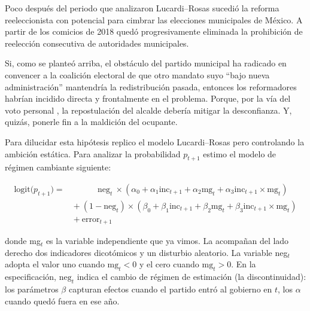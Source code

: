 \documentclass[letter,12pt]{article}
\begin{document}
Poco después del periodo que analizaron Lucardi--Rosas sucedió la reforma reeleccionista con potencial para cimbrar las elecciones municipales de México. A partir de los comicios de 2018 quedó progresivamente eliminada la prohibición de reelección consecutiva de autoridades municipales.

Si, como se planteó arriba, el obstáculo del partido municipal ha radicado en convencer a la coalición electoral de que otro mandato suyo ``bajo nueva administración'' mantendría la redistribución pasada, entonces los reformadores habrían incidido directa y frontalmente en el problema. Porque, por la vía del voto personal \citep{cain.etal.1987}, la repostulación del alcalde debería mitigar la desconfianza. Y, quizás, ponerle fin a la maldición del ocupante.


Para dilucidar esta hipótesis replico el modelo Lucardi--Rosas pero controlando la ambición estática. Para analizar la probabilidad $p_{t+1}$ estimo el modelo de régimen cambiante siguiente:

\begin{equation}\label{E:model}
\begin{split}
\text{logit}\bigl(p_{t+1}\bigr) =~  & ~~~~~~~~~~~~~\text{neg}_t~ \times (\alpha_0 + \alpha_1 \text{inc}_{t+1} + \alpha_2 \text{mg}_t + \alpha_3 \text{inc}_{t+1} \times \text{mg}_t) \\
                                   & +~ (1 - \text{neg}_t) \times (\beta_0 + \beta_1 \text{inc}_{t+1} + \beta_2 \text{mg}_t + \beta_3 \text{inc}_{t+1} \times \text{mg}_t)  \\
 & +~ \text{error}_{t+1}
\end{split}
\end{equation}

\noindent donde mg$_t$ es la variable independiente que ya vimos. La acompañan del lado derecho dos indicadores dicotómicos y un disturbio aleatorio. La variable neg$_t$ adopta el valor uno cuando $\text{mg}_t < 0$ y el cero cuando $\text{mg}_t>0$. En la especificación, $\text{neg}_t$ indica el cambio de régimen de estimación (la discontinuidad): los parámetros $\beta$ capturan efectos cuando el partido entró al gobierno en $t$, los $\alpha$ cuando quedó fuera en ese año.

\end{document}
